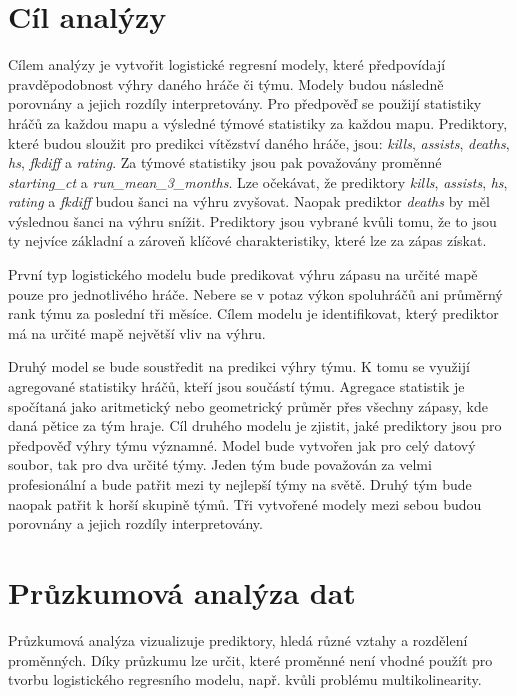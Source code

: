 \newpage
\section{Cíl analýzy}
{\color{red}
Cílem analýzy je vytvořit logistické regresní modely, které předpovídají pravděpodobnost výhry daného hráče či týmu. Modely budou následně porovnány a jejich rozdíly
interpretovány. Pro předpověď se použijí statistiky hráčů
za každou mapu a výsledné týmové statistiky za každou mapu.
Prediktory, které budou sloužit pro predikci vítězství daného hráče, jsou:
\textit{kills}, \textit{assists}, \textit{deaths},
\textit{hs}, \textit{fkdiff} a \textit{rating}. Za týmové statistiky jsou pak považovány proměnné \textit{starting\_ct} a \textit{run\_mean\_3\_months}. Lze očekávat, že
prediktory \textit{kills}, \textit{assists}, \textit{hs}, \textit{rating} a \textit{fkdiff} budou šanci na výhru zvyšovat. Naopak prediktor \textit{deaths} by měl
výslednou šanci na výhru snížit. Prediktory jsou vybrané kvůli tomu, že to jsou ty nejvíce základní a zároveň klíčové charakteristiky, které lze za zápas získat.

První typ logistického modelu bude predikovat výhru zápasu na určité mapě pouze pro jednotlivého hráče. Nebere se v potaz
výkon spoluhráčů ani průměrný rank týmu za poslední tři měsíce. Cílem modelu je identifikovat, který
prediktor
má na určité mapě největší vliv na výhru.

Druhý model se bude soustředit na predikci výhry týmu. K tomu se využijí agregované statistiky hráčů, kteří jsou součástí týmu. Agregace statistik je spočítaná jako
aritmetický nebo geometrický průměr přes všechny zápasy, kde daná pětice za tým hraje. Cíl druhého modelu je zjistit, jaké prediktory jsou pro předpověď výhry týmu významné.
Model bude vytvořen jak pro celý datový soubor, tak pro dva určité týmy. Jeden tým bude považován za velmi profesionální a bude patřit mezi ty nejlepší týmy na světě. Druhý
tým bude naopak patřit k horší skupině týmů. Tři vytvořené modely mezi sebou budou porovnány a jejich rozdíly interpretovány.
}

\section{Průzkumová analýza dat}
Průzkumová analýza vizualizuje prediktory, hledá různé vztahy a rozdělení proměnných. Díky průzkumu lze určit, které proměnné není vhodné použít pro tvorbu
logistického regresního modelu, např. kvůli problému multikolinearity.

